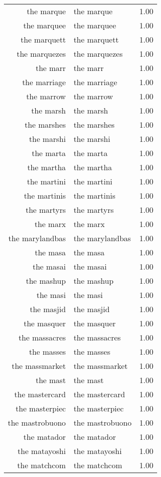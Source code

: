 \begin{table}[ht]
\begin{tabular}{rlr}
  the marque & the marque & 1.00 \\ 
  the marquee & the marquee & 1.00 \\ 
  the marquett & the marquett & 1.00 \\ 
  the marquezes & the marquezes & 1.00 \\ 
  the marr & the marr & 1.00 \\ 
  the marriage & the marriage & 1.00 \\ 
  the marrow & the marrow & 1.00 \\ 
  the marsh & the marsh & 1.00 \\ 
  the marshes & the marshes & 1.00 \\ 
  the marshi & the marshi & 1.00 \\ 
  the marta & the marta & 1.00 \\ 
  the martha & the martha & 1.00 \\ 
  the martini & the martini & 1.00 \\ 
  the martinis & the martinis & 1.00 \\ 
  the martyrs & the martyrs & 1.00 \\ 
  the marx & the marx & 1.00 \\ 
  the marylandbas & the marylandbas & 1.00 \\ 
  the masa & the masa & 1.00 \\ 
  the masai & the masai & 1.00 \\ 
  the mashup & the mashup & 1.00 \\ 
  the masi & the masi & 1.00 \\ 
  the masjid & the masjid & 1.00 \\ 
  the masquer & the masquer & 1.00 \\ 
  the massacres & the massacres & 1.00 \\ 
  the masses & the masses & 1.00 \\ 
  the massmarket & the massmarket & 1.00 \\ 
  the mast & the mast & 1.00 \\ 
  the mastercard & the mastercard & 1.00 \\ 
  the masterpiec & the masterpiec & 1.00 \\ 
  the mastrobuono & the mastrobuono & 1.00 \\ 
  the matador & the matador & 1.00 \\ 
  the matayoshi & the matayoshi & 1.00 \\ 
  the matchcom & the matchcom & 1.00 \\ 

\end{tabular}
\end{table}
